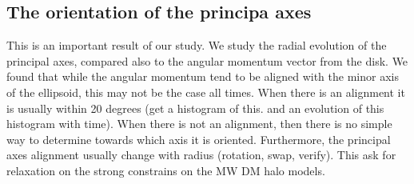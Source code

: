 \documentclass[a4paper,fleqn,usenatbib]{mnras}
\begin{document}
\subsection{The orientation of the principa axes}
This is an important result of our study. We study the radial evolution of the principal axes, compared also to the angular momentum vector from the disk. We found that while the angular momentum tend to be aligned with the minor axis of the ellipsoid, this may not be the case all times. When there is an alignment it is usually within 20 degrees (get a histogram of this. and an evolution of this histogram with time). When there is not an alignment, then there is no simple way to determine towards which axis it is oriented. Furthermore, the principal axes alignment usually change with radius (rotation, swap, verify). This ask for relaxation on the strong constrains on the MW DM halo models. 
\end{document}
